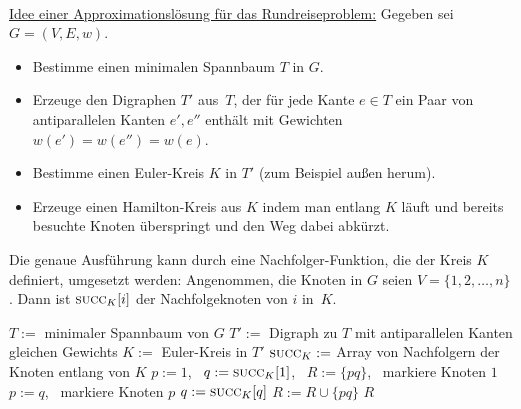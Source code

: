 \begin{bem}\,\\
\underline{Idee einer Approximationslösung für das Rundreiseproblem:} Gegeben sei $G=(V,E,w)$.
\begin{itemize}
 \item Bestimme einen minimalen Spannbaum $T$ in $G$.
 \item Erzeuge den Digraphen $T'$ aus~$T$, der für jede Kante $e \in T$ ein Paar von antiparallelen Kanten $e',e''$ enthält mit Gewichten $w(e')=w(e'')=w(e)$.
 \item Bestimme einen Euler-Kreis $K$ in $T'$ (zum Beispiel \glqq au\ss en herum\grqq).
 \item Erzeuge einen Hamilton-Kreis aus $K$ indem man entlang $K$ läuft und bereits besuchte Knoten überspringt und den Weg dabei \glqq abkürzt\grqq.
\end{itemize}
Die genaue Ausführung kann durch eine Nachfolger-Funktion, die der Kreis $K$ definiert, umgesetzt werden:
Angenommen, die Knoten in $G$ seien $V = \{1,2,\ldots,n\}$. Dann ist $\mathop{\text{\textsc{succ}}}_K[i]$ der Nachfolgeknoten von $i$ in~$K$.
\end{bem}


\begin{algorithm}[H]
\caption{$\cc{Rundreise-MSB}(G)$}
\begin{algorithmic}[1]
 \STATE $T :=$ minimaler Spannbaum von $G$
 \STATE $T' :=$ Digraph zu $T$ mit antiparallelen Kanten gleichen Gewichts
 \STATE $K :=$ Euler-Kreis in $T'$
 \STATE $\mathop{\text{\textsc{succ}}}_K :=$ Array von Nachfolgern der Knoten entlang von $K$
 \STATE $p := 1$, \ $q := \mathop{\text{\textsc{succ}}}_K[1]$, \ $R := \{pq\}$, \ markiere Knoten $1$
  \STATE $p := q$, \ markiere Knoten $p$
  \STATE {}
   \STATE $q := \mathop{\text{\textsc{succ}}}_K[q]$
  \ENDWHILE
  \STATE $R := R \cup \{pq\}$
 \ENDWHILE
 \RETURN $R$
\end{algorithmic}
\end{algorithm}


